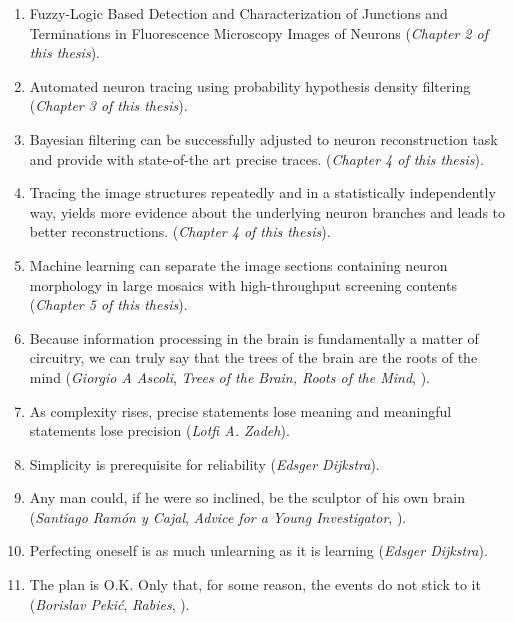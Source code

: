 \documentclass[10pt, twoside]{report}
\begin{document}
\begin{enumerate}
  
\item Fuzzy-Logic Based Detection and Characterization of Junctions and Terminations in Fluorescence Microscopy Images of Neurons 
(\emph{Chapter 2 of this thesis}). 
  
\medskip
  
\item Automated neuron tracing using probability hypothesis density filtering
	(\emph{Chapter 3 of this thesis}).  
  
\medskip
\item Bayesian filtering can be successfully adjusted to neuron reconstruction task and provide with state-of-the art precise traces. 
	(\emph{Chapter 4 of this thesis}).
	
\medskip
\item Tracing the image structures repeatedly and in a statistically independently way, yields more evidence about the underlying neuron branches and leads to better reconstructions.
	(\emph{Chapter 4 of this thesis}).

\medskip
\item Machine learning can separate the image sections containing neuron morphology in large mosaics with high-throughput screening contents (\emph{Chapter 5 of this thesis}). 

\medskip

\item Because information processing in the brain is fundamentally a matter of circuitry, we can truly say that the trees of the brain are the roots of the mind (\emph{Giorgio A Ascoli}, \emph{Trees of the Brain, Roots of the Mind}, ). 

\medskip 

\item As complexity rises, precise statements lose meaning and meaningful statements lose precision (\emph{Lotfi A. Zadeh}). 

\medskip
  
\item Simplicity is prerequisite for reliability (\emph{Edsger Dijkstra}).

\medskip

\item Any man could, if he were so inclined, be the sculptor of his own brain (\emph{Santiago Ram\'{o}n y Cajal}, \emph{Advice for a Young Investigator}, ).

\medskip

\item Perfecting oneself is as much unlearning as it is learning (\emph{Edsger Dijkstra}).

\medskip

\item The plan is O.K. Only that, for some reason, the events do not stick to it (\emph{Borislav Peki\'{c}}, \emph{Rabies}, ).

\end{enumerate}

\end{document}
